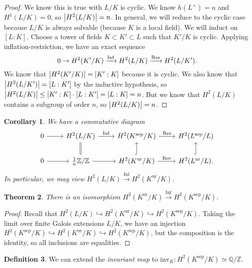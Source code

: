 \documentclass[leqno, openany]{memoir}
\newtheorem{thm}{Theorem}[section]
\newtheorem{cor}[thm]{Corollary}
\theoremstyle{definition}
\newtheorem{defn}[thm]{Definition}
\theoremstyle{remark}
\theoremstyle{plain}
\theoremstyle{definition}
\theoremstyle{remark}
\newcommand{\Z}{\mathbb{Z}}
\newcommand{\Q}{\mathbb{Q}}
\newcommand{\mr}[1]{\mathrm{#1}}
\DeclareMathOperator{\Inf}{Inf}
\begin{document}
\begin{proof} We know this is true with $L/K$ is cyclic. We know $h(L^{\times})
    = n$ and $H^1(L/K) = 0$, so $\abs{H^2(L/K)} = n$. In general, we will
    reduce to the cyclic case because $L/K$ is always solvable (because $K$ is
    a local field). We will induct on $[L:K]$. Choose a tower of fields $K
    \subset K' \subset L$ such that $K'/K$ is cyclic. Applying
    inflation-restriction, we have an exact sequence \[ 0 \to H^2(K'/K)
    \xrightarrow{\Inf} H^2(L/K) \xrightarrow{\Res} H^2(L/K'). \] We know that
    $\abs{H^2(K'/K)} = [K':K]$ because it is cyclic. We also know that
    $\abs{H^2(L/K')} = [L:K']$ by the inductive hypothesis, so $\abs{H^2(L/K)}
    \leq [K':K] \cdot [L:K'] = [L:K] = n$. But we know that $H^2(L/K)$ contains
    a subgroup of order $n$, so $\abs{H^2(L/K)} = n$.  \end{proof}

\begin{cor} We have a commutative diagram \begin{equation*} \begin{tikzcd} 0
    \ar{r} & H^2(L/K) \ar{r}{\Inf} & H^2(K^{\mr{sep}}/K) \ar{r}{\Res} &
    H^2(L^{\mr{sep}}/L) \\ 0 \ar{r} & \frac{1}{n}\Z/\Z \ar[equal]{u} \ar{r} &
    H^2(K^{\mr{ur}}/K) \ar{r}{\Res} \ar[hookrightarrow]{u} &
    H^2(L^{\mr{ur}}/L). \ar[hookrightarrow]{u} \end{tikzcd} \end{equation*} In
particular, we may view $H^2(L/K) \xrightarrow{\Inf} H^2(K^{\mr{ur}}/K)$.
\end{cor}

\begin{thm} There is an isomorphism $H^2(K^{\mr{ur}}/K) \xrightarrow{\Inf}
H^2(K^{\mr{sep}}/K)$.  \end{thm}

\begin{proof} Recall that $H^2(L/K) \hookrightarrow H^2(K^{\mr{ur}}/K)
    \hookrightarrow H^2(K^{\mr{sep}}/K)$. Taking the limit over finite Galois
    extensions $L/K$, we have an injection $H^2(K^{\mr{sep}}/K) \hookrightarrow
    H^2(K^{\mr{ur}}/K) \hookrightarrow H^2(K^{\mr{sep}}/K)$, but the
    composition is the identity, so all inclusions are equalities.  \end{proof}

\begin{defn} We can extend the \textit{invariant map} to $\mr{inv}_K \colon
H^2(K^{\mr{sep}}/K) \simeq \Q/\Z$.  \end{defn}
\end{document}
